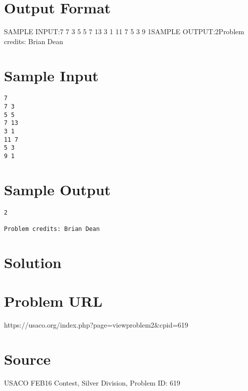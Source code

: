 \documentclass[12pt]{article}
\begin{document}
\section*{Output Format}
SAMPLE INPUT:7
7 3
5 5
7 13
3 1
11 7
5 3
9 1SAMPLE OUTPUT:2Problem credits: Brian Dean

\section*{Sample Input}
\begin{verbatim}
7
7 3
5 5
7 13
3 1
11 7
5 3
9 1
\end{verbatim}

\section*{Sample Output}
\begin{verbatim}
2

Problem credits: Brian Dean
\end{verbatim}

\section*{Solution}


\section*{Problem URL}
https://usaco.org/index.php?page=viewproblem2&cpid=619

\section*{Source}
USACO FEB16 Contest, Silver Division, Problem ID: 619
\end{document}
